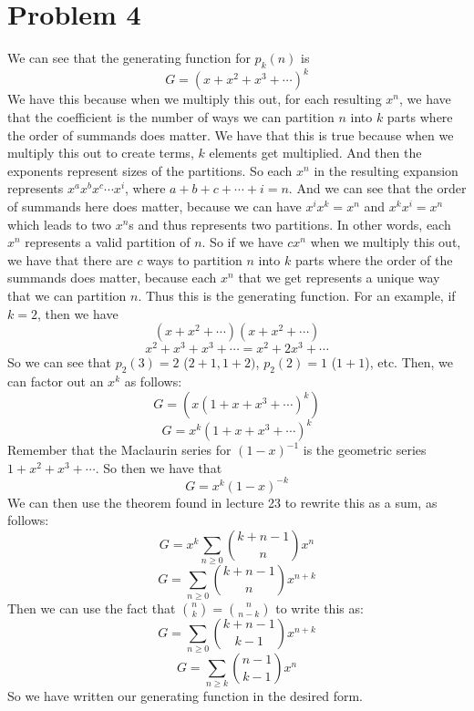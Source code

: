 \documentclass{article}
\begin{document}
\section*{Problem 4}
We can see that the generating function for $p_k(n)$ is
\[ G = (x + x^2 + x^3 + \cdots)^k \]
We have this because when we multiply this out, for each resulting $x^n$, we have that
the coefficient is the number of ways we can partition $n$ into $k$ parts where
the order of summands does matter. We have that this is true because when
we multiply this out to create terms, $k$ elements get multiplied. And then
the exponents represent sizes of the partitions. So each $x^n$ in the resulting
expansion represents $x^ax^bx^c \cdots x^i$, where $a+b+c+ \cdots + i  = n$.
And we can see that the order of summands here does matter, because we can
have $x^ix^k = x^n$ and $x^kx^i = x^n$ which leads to two $x^n$s and thus
represents two partitions.  In other words, each $x^n$ represents a valid
partition of $n$. So if we have $cx^n$ when we multiply this out, we have
that there are $c$ ways to partition $n$ into $k$ parts where the order
of the summands does matter, because each $x^n$ that we get represents
a unique way that we can partition $n$. Thus this is the generating function.
For an example, if $k = 2$, then we have
\[ (x+x^2+\cdots)(x+x^2+\cdots) \]
\[ x^2 + x^3 + x^3 + \cdots  = x^2 + 2x^3 + \cdots \]
So we can see that $p_2(3) = 2$ ($2+1,1+2)$, $p_2(2) = 1$ ($1+1$), etc.
Then, we can factor out an $x^k$ as follows:
\[ G = (x(1 + x + x^3 + \cdots)^k) \]
\[ G = x^k(1 + x + x^3 + \cdots)^k \]
Remember that the Maclaurin series for $(1-x)^{-1}$ is the geometric
series $1 + x^2 + x^3 + \cdots$. So then we have that
\[ G = x^k(1-x)^{-k} \]
We can then use the theorem found in lecture 23 to rewrite this as a sum,
as follows:
\[ G = x^k \sum_{n \geq 0} \binom{k+n-1}{n} x^n \]
\[ G = \sum_{n \geq 0} \binom{k+n-1}{n} x^{n+k} \]
Then we can use the fact that $\binom{n}{k} = \binom{n}{n-k}$ to write this
as:
\[ G = \sum_{n \geq 0} \binom{k+n-1}{k-1} x^{n+k} \]
\[ G = \sum_{n \geq k} \binom{n-1}{k-1} x^n \]
So we have written our generating function in the desired form.
\end{document}
